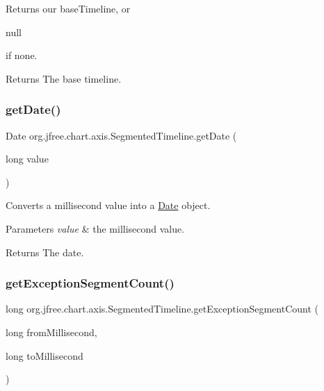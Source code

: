 Returns our base\+Timeline, or
\begin{DoxyCode}
null 
\end{DoxyCode}
 if none.

\begin{DoxyReturn}{Returns}
The base timeline. 
\end{DoxyReturn}
\mbox{\label{classorg_1_1jfree_1_1chart_1_1axis_1_1_segmented_timeline_a5cc0568fbb47b7584d6f21fb8424fdc1}} 
\subsubsection{\texorpdfstring{get\+Date()}{getDate()}}
{\footnotesize\ttfamily Date org.\+jfree.\+chart.\+axis.\+Segmented\+Timeline.\+get\+Date (\begin{DoxyParamCaption}\item[{long}]{value }\end{DoxyParamCaption})}

Converts a millisecond value into a \mbox{\hyperlink{}{Date}} object.


\begin{DoxyParams}{Parameters}
{\em value} & the millisecond value.\\
\hline
\end{DoxyParams}
\begin{DoxyReturn}{Returns}
The date. 
\end{DoxyReturn}
\mbox{\label{classorg_1_1jfree_1_1chart_1_1axis_1_1_segmented_timeline_add03d94349ef61560939ab0c9776294d}} 
\subsubsection{\texorpdfstring{get\+Exception\+Segment\+Count()}{getExceptionSegmentCount()}}
{\footnotesize\ttfamily long org.\+jfree.\+chart.\+axis.\+Segmented\+Timeline.\+get\+Exception\+Segment\+Count (\begin{DoxyParamCaption}\item[{long}]{from\+Millisecond,  }\item[{long}]{to\+Millisecond }\end{DoxyParamCaption})}

